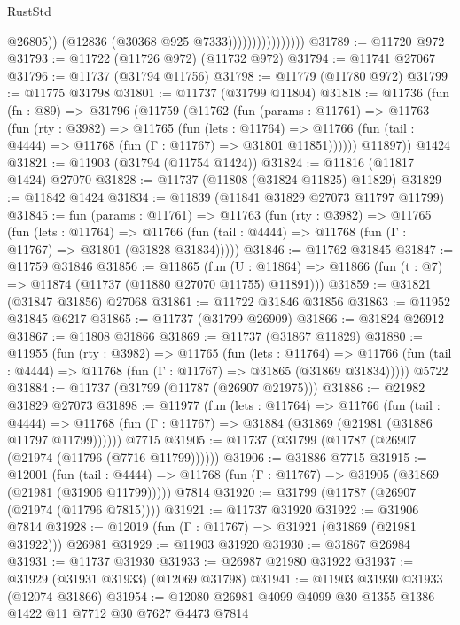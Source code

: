 \begin{lexlean}{RustStd}
\begin{coremodule}
                                    @26805))
                                (@12836 (@30368 @925 @7333))))))))))))))))
@31789 := @11720 @972
@31793 := @11722 (@11726 @972) (@11732 @972)
@31794 := @11741 @27067
@31796 := @11737 (@31794 @11756)
@31798 := @11779 (@11780 @972)
@31799 := @11775 @31798
@31801 := @11737 (@31799 @11804)
@31818 := @11736
    (fun (fn : @89) =>
    @31796
      (@11759
        (@11762
          (fun (params : @11761) =>
          @11763
            (fun (rty : @3982) =>
            @11765
              (fun (lets : @11764) =>
              @11766 (fun (tail : @4444) => @11768 (fun (Γ : @11767) => @31801 @11851))))))
        @11897))
    @1424
@31821 := @11903 (@31794 (@11754 @1424))
@31824 := @11816 (@11817 @1424) @27070
@31828 := @11737 (@11808 (@31824 @11825) @11829)
@31829 := @11842 @1424
@31834 := @11839 (@11841 @31829 @27073 @11797 @11799)
@31845 := fun (params : @11761) =>
  @11763
    (fun (rty : @3982) =>
    @11765
      (fun (lets : @11764) =>
      @11766 (fun (tail : @4444) => @11768 (fun (Γ : @11767) => @31801 (@31828 @31834)))))
@31846 := @11762 @31845
@31847 := @11759 @31846
@31856 := @11865
    (fun (U : @11864) => @11866 (fun (t : @7) => @11874 (@11737 (@11880 @27070 @11755) @11891)))
@31859 := @31821 (@31847 @31856) @27068
@31861 := @11722 @31846 @31856
@31863 := @11952 @31845 @6217
@31865 := @11737 (@31799 @26909)
@31866 := @31824 @26912
@31867 := @11808 @31866
@31869 := @11737 (@31867 @11829)
@31880 := @11955
    (fun (rty : @3982) =>
    @11765
      (fun (lets : @11764) =>
      @11766 (fun (tail : @4444) => @11768 (fun (Γ : @11767) => @31865 (@31869 @31834)))))
    @5722
@31884 := @11737 (@31799 (@11787 (@26907 @21975)))
@31886 := @21982 @31829 @27073
@31898 := @11977
    (fun (lets : @11764) =>
    @11766
      (fun (tail : @4444) =>
      @11768 (fun (Γ : @11767) => @31884 (@31869 (@21981 (@31886 @11797 @11799))))))
    @7715
@31905 := @11737 (@31799 (@11787 (@26907 (@21974 (@11796 (@7716 @11799))))))
@31906 := @31886 @7715
@31915 := @12001
    (fun (tail : @4444) => @11768 (fun (Γ : @11767) => @31905 (@31869 (@21981 (@31906 @11799)))))
    @7814
@31920 := @31799 (@11787 (@26907 (@21974 (@11796 @7815))))
@31921 := @11737 @31920
@31922 := @31906 @7814
@31928 := @12019 (fun (Γ : @11767) => @31921 (@31869 (@21981 @31922))) @26981
@31929 := @11903 @31920
@31930 := @31867 @26984
@31931 := @11737 @31930
@31933 := @26987 @21980 @31922
@31937 := @31929 (@31931 @31933) (@12069 @31798)
@31941 := @11903 @31930 @31933 (@12074 @31866)
@31954 := @12080 @26981 @4099 @4099 @30 @1355 @1386 @1422 @11 @7712 @30 @7627 @4473 @7814

\end{coremodule}
\end{lexlean}
